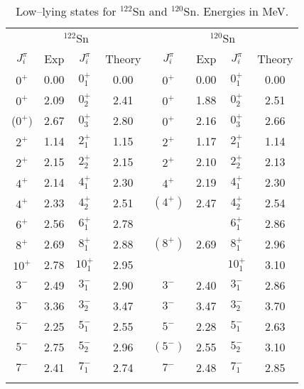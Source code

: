 \begin{table}[htbp]
\begin{center}
\begin{tabular}{cccc|cccc}
\hline
\multicolumn{4}{c}{ $^{122}$Sn} & \multicolumn{4}{c}{ $^{120}$Sn}\\ 
{$J^{\pi}_i$} & {Exp} & {$J^{\pi}_i$} & {Theory} & 
{$J^{\pi}_i$} & {Exp} & {$J^{\pi}_i$} & {Theory} \\
\hline 
$0^{+}$ & 0.00 & $0^{+}_{1}$ & 0.00 &
  $0^{+}$ & 0.00 & $0^{+}_{1}$ & 0.00 \\
$0^{+}$ & 2.09 & $0^{+}_{2}$ & 2.41 &
  $0^{+}$ & 1.88 & $0^{+}_{2}$ & 2.51 \\
($0^{+})$ & 2.67 & $0^{+}_{3}$ & 2.80 & 
  $0^{+}$ & 2.16 & $0^{+}_{3}$ & 2.66 \\
$2^{+}$ & 1.14 & $2^{+}_{1}$ & 1.15 &
  $2^{+}$ & 1.17 & $2^{+}_{1}$ & 1.14 \\
$2^{+}$ & 2.15 & $2^{+}_{2}$ & 2.15 & 
  $2^{+}$ & 2.10 & $2^{+}_{2}$ & 2.13 \\
$4^{+}$ & 2.14 & $4^{+}_{1}$ & 2.30 &
  $4^{+}$ & 2.19 & $4^{+}_{1}$ & 2.30 \\
$4^{+}$ & 2.33 & $4^{+}_{2}$ & 2.51 &
  $(4^{+})$ & 2.47 & $4^{+}_{2}$ & 2.54 \\
$6^{+}$ & 2.56 & $6^{+}_{1}$ & 2.78 &
          &      & $6^{+}_{1}$ & 2.86 \\
$8^{+}$ & 2.69 & $8^{+}_{1}$ & 2.88 &
  $(8^{+})$ & 2.69 & $8^{+}_{1}$ & 2.96 \\
$10^{+}$ & 2.78 & $10^{+}_{1}$ & 2.95 &
          &     & $10^{+}_{1}$ & 3.10 \\
$3^{-}$ & 2.49 & $3^{-}_{1}$ & 2.90 &
  $3^{-}$ & 2.40 & $3^{-}_{1}$ & 2.86 \\
$3^{-}$ & 3.36 & $3^{-}_{2}$ & 3.47 &
  $3^{-}$ & 3.47 & $3^{-}_{2}$ & 3.70 \\
$5^{-}$ & 2.25 & $5^{-}_{1}$ & 2.55 &
  $5^{-}$ & 2.28 & $5^{-}_{1}$ & 2.63 \\
$5^{-}$ & 2.75 & $5^{-}_{2}$ & 2.96 &
  $(5^{-})$ & 2.55 & $5^{-}_{2}$ & 3.10 \\
%
$7^{-}$ & 2.41 & $7^{-}_{1}$ & 2.74 &
  $7^{-}$ & 2.48 & $7^{-}_{1}$ & 2.85 \\
&&&\\ \hline
\end{tabular}
\caption{Low--lying states for  $^{122}$Sn and $^{120}$Sn. Energies in MeV.}
\label{tab:sn120}
\end{center}
\end{table}

